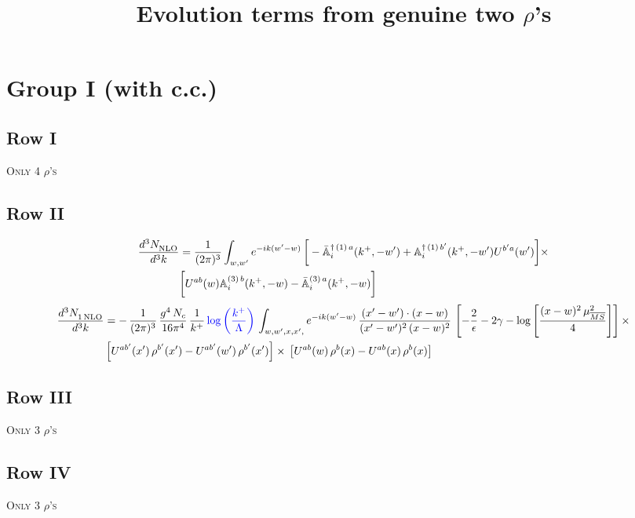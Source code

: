 \documentclass[9pt]{article}
\title{Evolution terms from genuine two $\rho$'s}
\author{}
\date{}
\def\mf#1{\mathbb{#1}}
\numberwithin{equation}{section}
\begin{document}
\maketitle
\section{Group I (with c.c.)}
\subsection{Row I}
\textsc{Only 4 $\rho$'s}
\subsection{Row II}
\begin{align}
    \frac{d^{3}N_{\rm NLO}^{\rm}}{d^{3}k} &  = \frac{1}{(2\pi)^{3}}  \int_{w, w^\prime} e^{-ik(w^\prime-w)}\,\bigg[-\bar{\mf{A}}^{\dagger\,(1)\,a}_{i}(k^{+},-w^{\prime})+\mf{A}^{\dagger\, (1)\, b^{\prime}}_{i}(k^{+},-w^{\prime})U^{b^{\prime}a}(w^{\prime})\bigg]\times \notag \\ & \bigg[U^{ab}(w)\mf{A}^{(3)\, b}_{i}(k^{+},- w)-\Bar{\mf{A}}^{(3)\, a}_{i}(k^{+}, - w)\bigg]\nonumber
\end{align}
\begin{align}
     \frac{d^{3}N_{1\,\rm NLO}^{\rm}}{d^{3}k} &  = -\,\frac{1}{(2\pi)^{3}}\, \frac{g^{4}\,N_{c}}{16\pi^{4}}\,\frac{1}{k^{+}}\,{\color{blue}\log{\left(\frac{k^{+}}{\Lambda}\right)}}\, \int_{w, w',x,x',} e^{-ik(w^\prime-w)}\, \frac{(x'-w')\cdot (x-w)}{(x'-w')^{2}\, (x-w)^{2}}\, \left[-\frac{2}{\epsilon}-2\gamma-\log{\left[\frac{(x-w)^{2}\,\mu^{2}_{\overline{MS}}}{4}\right]}\right]\times\notag \\ & \left[U^{ab'}(x')\,\rho^{b'}(x') - U^{ab'}(w')\,\rho^{b'}(x')\right]\times\,\left[U^{ab}(w)\,\rho^{b}(x) - U^{ab}(x)\,\rho^{b}(x)\right]
\end{align}
\subsection{Row III}
\textsc{Only 3 $\rho$'s}
\subsection{Row IV}
\textsc{Only 3 $\rho$'s}
\end{document}
